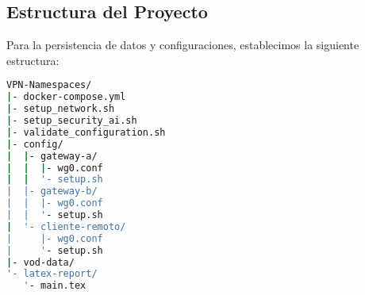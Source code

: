 \subsection{Estructura del Proyecto}

Para la persistencia de datos y configuraciones, establecimos la siguiente estructura:

\begin{lstlisting}[language=bash, caption=Estructura de directorios del proyecto]
VPN-Namespaces/
|- docker-compose.yml
|- setup_network.sh
|- setup_security_ai.sh
|- validate_configuration.sh
|- config/
|  |- gateway-a/
|  |  |- wg0.conf
|  |  '- setup.sh
|  |- gateway-b/
|  |  |- wg0.conf
|  |  '- setup.sh
|  '- cliente-remoto/
|     |- wg0.conf
|     '- setup.sh
|- vod-data/
'- latex-report/
   '- main.tex
\end{lstlisting}
